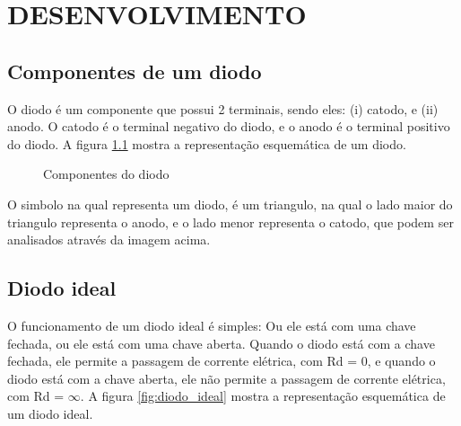 \chapter{DESENVOLVIMENTO}

\section{Componentes de um diodo}

O diodo é um componente que possui 2 terminais, sendo eles: (i) catodo, e (ii) anodo. O catodo é o terminal negativo do diodo, e o anodo é o terminal positivo do diodo. A figura \ref{fig:componentes_diodo} mostra a representação esquemática de um diodo.

\begin{figure}[H]
    \centering
    \caption{Componentes do diodo}
    \vspace{-0.3cm}
    \label{fig:componentes_diodo}
\end{figure}

O simbolo na qual representa um diodo, é um triangulo, na qual o lado maior do triangulo representa o anodo, e o lado menor representa o catodo, que podem ser analisados através da imagem acima.

\section{Diodo ideal}

O funcionamento de um diodo ideal é simples: Ou ele está com uma chave fechada, ou ele está com uma chave aberta. Quando o diodo está com a chave fechada, ele permite a passagem de corrente elétrica, com Rd = 0, e quando o diodo está com a chave aberta, ele não permite a passagem de corrente elétrica, com Rd = $\infty$. A figura \ref{fig:diodo_ideal} mostra a representação esquemática de um diodo ideal.

